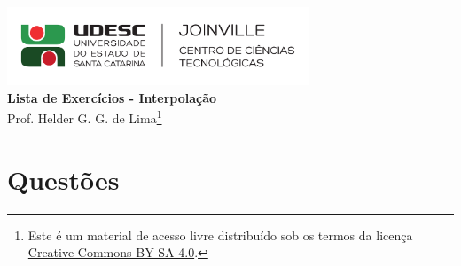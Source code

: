 \documentclass[12pt,a4paper]{article}
\author{\eu}
\title{\tipo}
\date{\data}
\newcommand{\IconPc}{\texttt{[image: computer.png]}}
\newcommand{\IconCalc}{\texttt{[image: calculator.png]}}
\newcommand{\IconThink}{\texttt{[image: pencil.png]}}
\newcommand{\IconCheck}{\texttt{[image: checkmark.png]}}
\newlength{\SmileysLength}
\newcommand{\calc}{\hspace*{-\SmileysLength}\makebox[0pt][r]{\IconCalc}%
   \hspace*{\SmileysLength}}
\newcommand{\software}{\hspace*{-\SmileysLength}\makebox[0pt][r]{\IconPc}%
   \hspace*{\SmileysLength}}
\newcommand{\teoria}{\hspace*{-\SmileysLength}\makebox[0pt][r]{\IconThink}%
   \hspace*{\SmileysLength}}
\newcommand{\conceito}{\hspace*{-\SmileysLength}\makebox[0pt][r]{\IconCheck}%
   \hspace*{\SmileysLength}}
\newcommand*\tipo{Lista de Exercícios - Interpolação}
\newcommand*\eu{Helder G. G. de Lima}
\begin{document}
\begin{center}
\includegraphics[width=9.0cm]{marca} \\
\textbf{\tipo} \\
Prof. \eu\footnote{
Este é um material de acesso livre distribuído sob os termos da licença \href{https://creativecommons.org/licenses/by-sa/4.0/deed.pt_BR}{Creative Commons BY-SA 4.0}.}
\end{center}


\section*{Questões}
\end{document}
